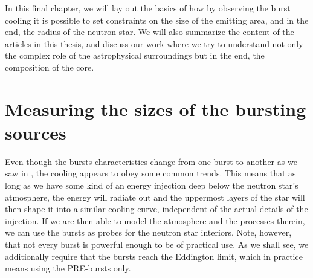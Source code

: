 In this final chapter, we will lay out the basics of how by observing the burst cooling it is possible to set constraints on the size of the emitting area, and in the end, the radius of the neutron star.
We will also summarize the content of the articles in this thesis, and discuss our work where we try to understand not only the complex role of the astrophysical surroundings but in the end, the composition of the core.


\section{Measuring the sizes of the bursting sources}

Even though the bursts characteristics change from one burst to another as we saw in , the cooling appears to obey some common trends.
This means that as long as we have some kind of an energy injection deep below the neutron star's atmosphere, the energy will radiate out and the uppermost layers of the star will then shape it into a similar cooling curve, independent of the actual details of the injection.
If we are then able to model the atmosphere and the processes therein, we can use the bursts as probes for the neutron star interiors.
Note, however, that not every burst is powerful enough to be of practical use.
As we shall see, we additionally require that the bursts reach the Eddington limit, which in practice means using the PRE-bursts only.

